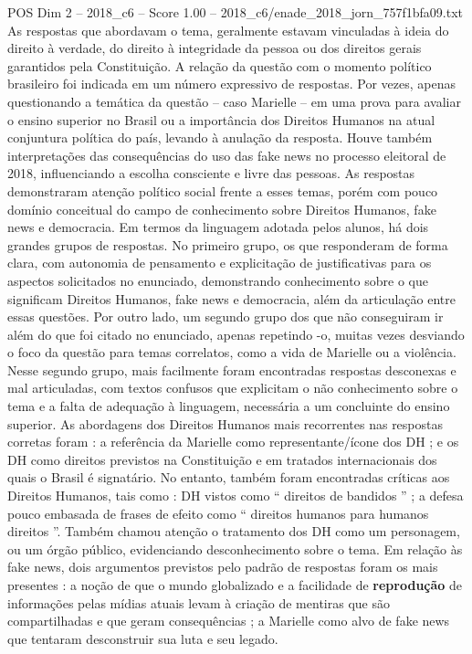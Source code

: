 \begin{textsample}{POS Dim 2 – 2018\_c6 – Score 1.00 – 2018\_c6/enade\_2018\_jorn\_757f1bfa09.txt}
As respostas que abordavam o tema, geralmente estavam vinculadas à ideia do direito à verdade, do direito à integridade da pessoa ou dos direitos gerais garantidos pela Constituição.
A relação da questão com o momento político brasileiro foi indicada em um número expressivo de respostas.
Por vezes, apenas questionando a temática da questão – caso Marielle – em uma prova para avaliar o ensino superior no Brasil ou a importância dos Direitos Humanos na atual conjuntura política do país, levando à anulação da resposta.
Houve também interpretações das consequências do uso das fake news no processo eleitoral de 2018, influenciando a escolha consciente e livre das pessoas.
As respostas demonstraram atenção político social frente a esses temas, porém com pouco domínio conceitual do campo de conhecimento sobre Direitos Humanos, fake news e democracia.
Em termos da linguagem adotada pelos alunos, há dois grandes grupos de respostas.
No primeiro grupo, os que responderam de forma clara, com autonomia de pensamento e explicitação de justificativas para os aspectos solicitados no enunciado, demonstrando conhecimento sobre o que significam Direitos Humanos, fake news e democracia, além da articulação entre essas questões.
Por outro lado, um segundo grupo dos que não conseguiram ir além do que foi citado no enunciado, apenas repetindo -o, muitas vezes desviando o foco da questão para temas correlatos, como a vida de Marielle ou a violência.
Nesse segundo grupo, mais facilmente foram encontradas respostas desconexas e mal articuladas, com textos confusos que explicitam o não conhecimento sobre o tema e a falta de adequação à linguagem, necessária a um concluinte do ensino superior.
As abordagens dos Direitos Humanos mais recorrentes nas respostas corretas foram : a referência da Marielle como representante/ícone dos DH ; e os DH como direitos previstos na Constituição e em tratados internacionais dos quais o Brasil é signatário.
No entanto, também foram encontradas críticas aos Direitos Humanos, tais como : DH vistos como “ direitos de bandidos ” ; a defesa pouco embasada de frases de efeito como “ direitos humanos para humanos direitos ”.
Também chamou atenção o tratamento dos DH como um personagem, ou um órgão público, evidenciando desconhecimento sobre o tema.
Em relação às fake news, dois argumentos previstos pelo padrão de respostas foram os mais presentes : a noção de que o mundo globalizado e a facilidade de \textbf{reprodução} de informações pelas mídias atuais levam à criação de mentiras que são compartilhadas e que geram consequências ; a Marielle como alvo de fake news que tentaram desconstruir sua luta e seu legado.

\end{textsample}
